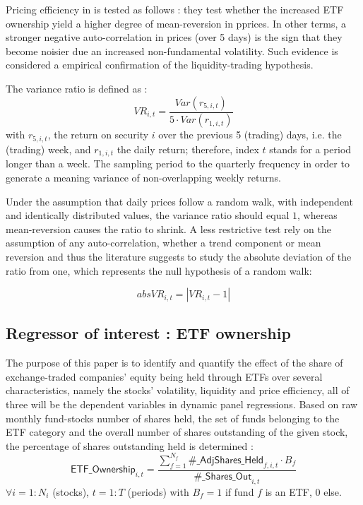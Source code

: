 Pricing efficiency in \textcite{Ben-David2018} is tested as follows : they test whether the increased ETF ownership yield a higher degree of mean-reversion in pprices. In other terms, a stronger negative auto-correlation in prices (over 5 days) is the sign that they become noisier due an increased non-fundamental volatility. Such evidence is considered a empirical confirmation of the liquidity-trading hypothesis.

The variance ratio is defined as :
\begin{equation}
 VR_{i,t} = \frac{\mathit{Var}(r_{5,i,t})}{5 \cdot \mathit{Var}(r_{1, i,t})}
\end{equation}
with $r_{5,i,t}$, the return on security $i$ over the previous 5 (trading) days, i.e. the (trading) week, and $r_{1, i, t}$ the daily return; therefore, index $t$ stands for a period longer than a week. The sampling period to the quarterly frequency in order to generate a meaning variance of non-overlapping weekly returns.

Under the assumption that daily prices follow a random walk, with independent and identically distributed values, the variance ratio should equal $1$, whereas mean-reversion causes the ratio to shrink. A less restrictive test rely on the assumption of any auto-correlation, whether a trend component or mean reversion and thus the literature suggests to study the absolute deviation of the ratio from one, which represents the null hypothesis of a random walk:

\begin{equation}
absVR_{i,t} = \left\lvert VR_{i, t}  - 1\right\rvert  
\end{equation}

\subsection{Regressor of interest : ETF ownership}
The purpose of this paper is to identify and quantify the effect of the share of exchange-traded companies' equity being held through ETFs over several characteristics, namely the stocks' volatility, liquidity and price efficiency, all of three will be the dependent variables in dynamic panel regressions. Based on raw monthly fund-stocks number of shares held, the set of funds belonging to the ETF category and the overall number of shares outstanding of the given stock, the percentage of shares outstanding held is determined :
\begin{equation}
  \mathsf{ETF\_Ownership}_{i, t} = \frac{\sum_{f = 1}^{N_{f}} \mathsf{\#\_AdjShares\_Held}_{f, i, t}\cdot B_{f}}{\mathsf{\#\_Shares\_Out}_{i, t}}
\end{equation}
$\forall i = 1:N_{i}$ (stocks), $t = 1:T$ (periods)
with $B_{f} = 1$ if fund $f$ is an ETF, $0$ else.

